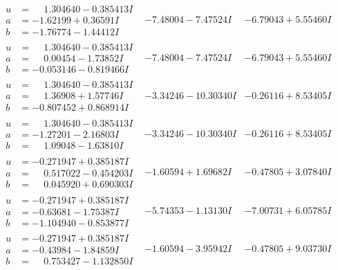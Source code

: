 \documentclass[1p]{elsarticle_modified}
\theoremstyle{definition}
\begin{document}
$$\begin{array}{c|c|c}
\begin{aligned}
u &= \phantom{-}1.304640 - 0.385413 I \\
a &= -1.62199 + 0.36591 I \\
b &= -1.76774 - 1.44412 I\end{aligned}
 & -7.48004 - 7.47524 I & -6.79043 + 5.55460 I \\ \hline\begin{aligned}
u &= \phantom{-}1.304640 - 0.385413 I \\
a &= \phantom{-}0.00454 - 1.73852 I \\
b &= -0.053146 - 0.819466 I\end{aligned}
 & -7.48004 - 7.47524 I & -6.79043 + 5.55460 I \\ \hline\begin{aligned}
u &= \phantom{-}1.304640 - 0.385413 I \\
a &= \phantom{-}1.36908 + 1.57746 I \\
b &= -0.807452 + 0.868914 I\end{aligned}
 & -3.34246 - 10.30340 I & -0.26116 + 8.53405 I \\ \hline\begin{aligned}
u &= \phantom{-}1.304640 - 0.385413 I \\
a &= -1.27201 - 2.16803 I \\
b &= \phantom{-}1.09048 - 1.63810 I\end{aligned}
 & -3.34246 - 10.30340 I & -0.26116 + 8.53405 I \\ \hline\begin{aligned}
u &= -0.271947 + 0.385187 I \\
a &= \phantom{-}0.517022 - 0.454203 I \\
b &= \phantom{-}0.045920 + 0.690303 I\end{aligned}
 & -1.60594 + 1.69682 I & -0.47805 + 3.07840 I \\ \hline\begin{aligned}
u &= -0.271947 + 0.385187 I \\
a &= -0.63681 - 1.75387 I \\
b &= -1.104940 - 0.853877 I\end{aligned}
 & -5.74353 - 1.13130 I & -7.00731 + 6.05785 I \\ \hline\begin{aligned}
u &= -0.271947 + 0.385187 I \\
a &= -0.43984 - 1.84859 I \\
b &= \phantom{-}0.753427 - 1.132850 I\end{aligned}
 & -1.60594 - 3.95942 I & -0.47805 + 9.03730 I \\ \hline\begin{aligned}

\end{aligned}
\end{array}$$
\end{document}
